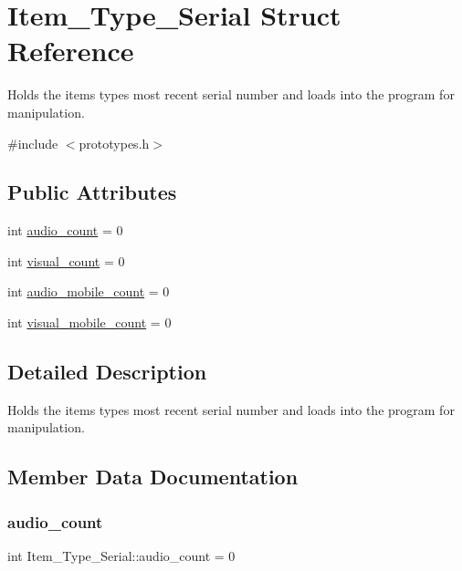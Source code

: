 \hypertarget{struct_item___type___serial}{}\section{Item\+\_\+\+Type\+\_\+\+Serial Struct Reference}
\label{struct_item___type___serial}


Holds the items types most recent serial number and loads into the program for manipulation.  




{\ttfamily \#include $<$prototypes.\+h$>$}

\subsection*{Public Attributes}
\begin{DoxyCompactItemize}
\item 
int \mbox{\hyperlink{struct_item___type___serial_a622d410cdab4628fa131a61796f1613e}{audio\+\_\+count}} = 0
\item 
int \mbox{\hyperlink{struct_item___type___serial_a3b8c1cc9b2d2e0e55cf7d37b8c965a99}{visual\+\_\+count}} = 0
\item 
int \mbox{\hyperlink{struct_item___type___serial_a9b4542d4191a1f85d2c8460f482228f5}{audio\+\_\+mobile\+\_\+count}} = 0
\item 
int \mbox{\hyperlink{struct_item___type___serial_ae57046b7a7afa72262358b690b068ada}{visual\+\_\+mobile\+\_\+count}} = 0
\end{DoxyCompactItemize}


\subsection{Detailed Description}
Holds the items types most recent serial number and loads into the program for manipulation. 



\subsection{Member Data Documentation}
\mbox{\label{struct_item___type___serial_a622d410cdab4628fa131a61796f1613e}} 
\subsubsection{\texorpdfstring{audio\_count}{audio\_count}}
{\footnotesize\ttfamily int Item\+\_\+\+Type\+\_\+\+Serial\+::audio\+\_\+count = 0}

